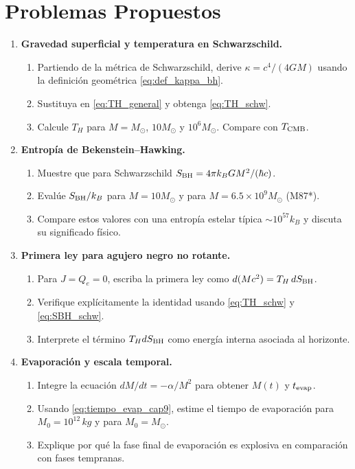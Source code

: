 \section{Problemas Propuestos}
\label{sec:problemas_cap9}

\begin{enumerate}[leftmargin=2em, label=\textbf{P\thechapter.\arabic*.}]

  \item \textbf{Gravedad superficial y temperatura en Schwarzschild.}
  \begin{enumerate}[label=(\alph*)]
    \item Partiendo de la métrica de Schwarzschild, derive $\kappa = c^4/(4GM)$ usando la definición geométrica \eqref{eq:def_kappa_bh}.
    \item Sustituya en \eqref{eq:TH_general} y obtenga \eqref{eq:TH_schw}.
    \item Calcule $T_H$ para $M = M_\odot$, $10M_\odot$ y $10^6M_\odot$. Compare con $T_{\rm CMB}$.
  \end{enumerate}

  \item \textbf{Entropía de Bekenstein--Hawking.}
  \begin{enumerate}[label=(\alph*)]
    \item Muestre que para Schwarzschild $S_{\rm BH}=4\pi k_BGM^2/(\hbar c)$.
    \item Evalúe $S_{\rm BH}/k_B$ para $M=10M_\odot$ y para $M=6.5\times10^9M_\odot$ (M87*).
    \item Compare estos valores con una entropía estelar típica $\sim10^{57}k_B$ y discuta su significado físico.
  \end{enumerate}

  \item \textbf{Primera ley para agujero negro no rotante.}
  \begin{enumerate}[label=(\alph*)]
    \item Para $J=Q_e=0$, escriba la primera ley como $d(Mc^2)=T_H\,dS_{\rm BH}$.
    \item Verifique explícitamente la identidad usando \eqref{eq:TH_schw} y \eqref{eq:SBH_schw}.
    \item Interprete el término $T_H dS_{\rm BH}$ como energía interna asociada al horizonte.
  \end{enumerate}

  \item \textbf{Evaporación y escala temporal.}
  \begin{enumerate}[label=(\alph*)]
    \item Integre la ecuación $dM/dt=-\alpha/M^2$ para obtener $M(t)$ y $t_{\rm evap}$.
    \item Usando \eqref{eq:tiempo_evap_cap9}, estime el tiempo de evaporación para $M_0=10^{12}\,\si{kg}$ y para $M_0=M_\odot$.
    \item Explique por qué la fase final de evaporación es explosiva en comparación con fases tempranas.
  \end{enumerate}


\end{enumerate}
